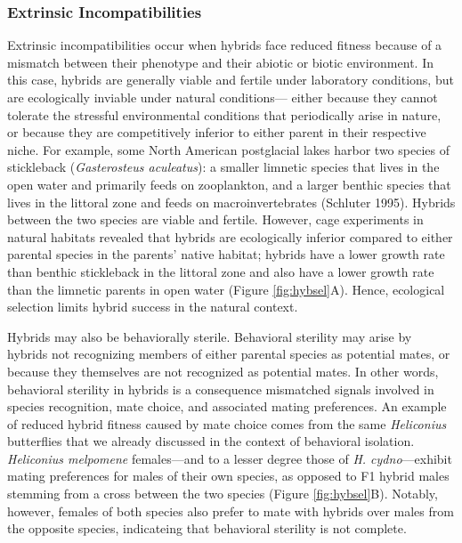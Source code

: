 \documentclass[
]{book}
\begin{document}
\hypertarget{extrinsic-incompatibilities}{%
\subsubsection*{Extrinsic Incompatibilities}\label{extrinsic-incompatibilities}}

Extrinsic incompatibilities occur when hybrids face reduced fitness because of a mismatch between their phenotype and their abiotic or biotic environment. In this case, hybrids are generally viable and fertile under laboratory conditions, but are ecologically inviable under natural conditions--- either because they cannot tolerate the stressful environmental conditions that periodically arise in nature, or because they are competitively inferior to either parent in their respective niche. For example, some North American postglacial lakes harbor two species of stickleback (\emph{Gasterosteus aculeatus}): a smaller limnetic species that lives in the open water and primarily feeds on zooplankton, and a larger benthic species that lives in the littoral zone and feeds on macroinvertebrates (Schluter 1995). Hybrids between the two species are viable and fertile. However, cage experiments in natural habitats revealed that hybrids are ecologically inferior compared to either parental species in the parents' native habitat; hybrids have a lower growth rate than benthic stickleback in the littoral zone and also have a lower growth rate than the limnetic parents in open water (Figure \ref{fig:hybsel}A). Hence, ecological selection limits hybrid success in the natural context.

Hybrids may also be behaviorally sterile. Behavioral sterility may arise by hybrids not recognizing members of either parental species as potential mates, or because they themselves are not recognized as potential mates. In other words, behavioral sterility in hybrids is a consequence mismatched signals involved in species recognition, mate choice, and associated mating preferences. An example of reduced hybrid fitness caused by mate choice comes from the same \emph{Heliconius} butterflies that we already discussed in the context of behavioral isolation. \emph{Heliconius melpomene} females---and to a lesser degree those of \emph{H. cydno}---exhibit mating preferences for males of their own species, as opposed to F1 hybrid males stemming from a cross between the two species (Figure \ref{fig:hybsel}B). Notably, however, females of both species also prefer to mate with hybrids over males from the opposite species, indicateing that behavioral sterility is not complete.
\end{document}

